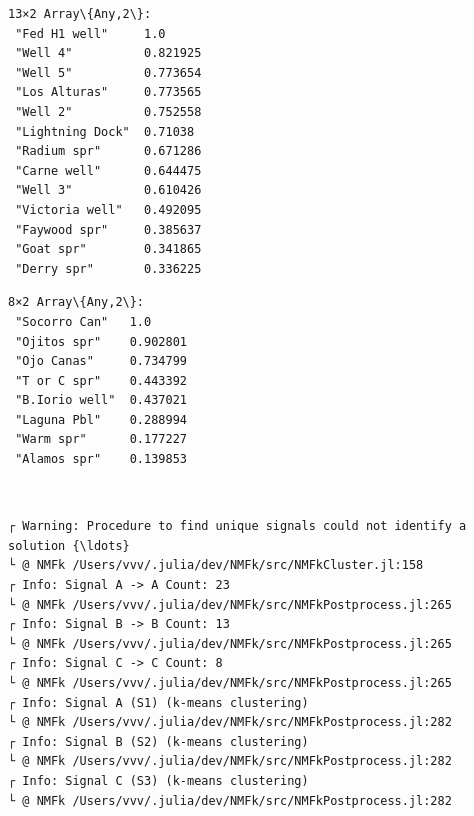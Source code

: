 \documentclass[11pt]{article}
\begin{document}
    \begin{Verbatim}[commandchars=\\\{\}]
13×2 Array\{Any,2\}:
 "Fed H1 well"     1.0
 "Well 4"          0.821925
 "Well 5"          0.773654
 "Los Alturas"     0.773565
 "Well 2"          0.752558
 "Lightning Dock"  0.71038
 "Radium spr"      0.671286
 "Carne well"      0.644475
 "Well 3"          0.610426
 "Victoria well"   0.492095
 "Faywood spr"     0.385637
 "Goat spr"        0.341865
 "Derry spr"       0.336225
    \end{Verbatim}



    \begin{Verbatim}[commandchars=\\\{\}]
8×2 Array\{Any,2\}:
 "Socorro Can"   1.0
 "Ojitos spr"    0.902801
 "Ojo Canas"     0.734799
 "T or C spr"    0.443392
 "B.Iorio well"  0.437021
 "Laguna Pbl"    0.288994
 "Warm spr"      0.177227
 "Alamos spr"    0.139853
    \end{Verbatim}


    \begin{center}
    \end{center}
    { \hspace*{\fill} \\}

    \begin{Verbatim}[commandchars=\\\{\}]
┌ Warning: Procedure to find unique signals could not identify a solution {\ldots}
└ @ NMFk /Users/vvv/.julia/dev/NMFk/src/NMFkCluster.jl:158
┌ Info: Signal A -> A Count: 23
└ @ NMFk /Users/vvv/.julia/dev/NMFk/src/NMFkPostprocess.jl:265
┌ Info: Signal B -> B Count: 13
└ @ NMFk /Users/vvv/.julia/dev/NMFk/src/NMFkPostprocess.jl:265
┌ Info: Signal C -> C Count: 8
└ @ NMFk /Users/vvv/.julia/dev/NMFk/src/NMFkPostprocess.jl:265
┌ Info: Signal A (S1) (k-means clustering)
└ @ NMFk /Users/vvv/.julia/dev/NMFk/src/NMFkPostprocess.jl:282
┌ Info: Signal B (S2) (k-means clustering)
└ @ NMFk /Users/vvv/.julia/dev/NMFk/src/NMFkPostprocess.jl:282
┌ Info: Signal C (S3) (k-means clustering)
└ @ NMFk /Users/vvv/.julia/dev/NMFk/src/NMFkPostprocess.jl:282
    \end{Verbatim}

    \begin{center}
    \end{center}
    { \hspace*{\fill} \\}
\end{document}
